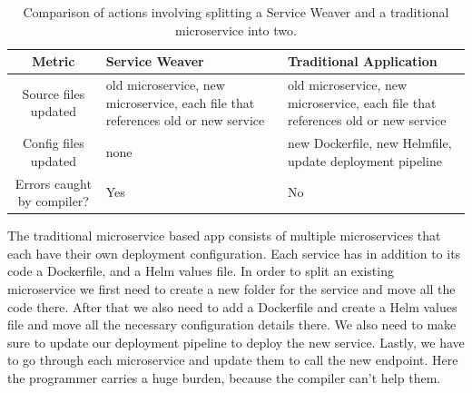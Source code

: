 \documentclass[sigconf,review,9pt]{acmart}
\begin{document}
\begin{table}[h]
	\centering
	\caption{Comparison of actions involving splitting a Service Weaver and a
		traditional microservice into two.}
	\label{tab:split_ms}
	\begin{tabularx}{\columnwidth}{cXX}
		\toprule
		Metric                     & Service Weaver                                                                   & Traditional Application                                                          \\
		\midrule
		Source files updated       & old microservice, new microservice, each file that references old or new service & old microservice, new microservice, each file that references old or new service \\
		Config files updated       & none                                                                             & new Dockerfile, new Helmfile, update deployment pipeline                         \\
		Errors caught by compiler? & Yes                                                                              & No                                                                               \\
		\bottomrule
	\end{tabularx}
\end{table}



The traditional microservice based app consists of multiple microservices that each
have their own deployment configuration.
Each service has \textemdash in addition to its code \textemdash a Dockerfile, and a Helm
values file.
In order to split an existing microservice we first need to create a new folder
for the service and move all the code there.
After that we also need to add a Dockerfile and create a Helm values file and move
all the necessary configuration details there.
We also need to make sure to update our deployment pipeline to deploy the new
service.
Lastly, we have to go through each microservice and update them to call the new endpoint.
Here the programmer carries a huge burden, because the compiler can't help them.
\end{document}
